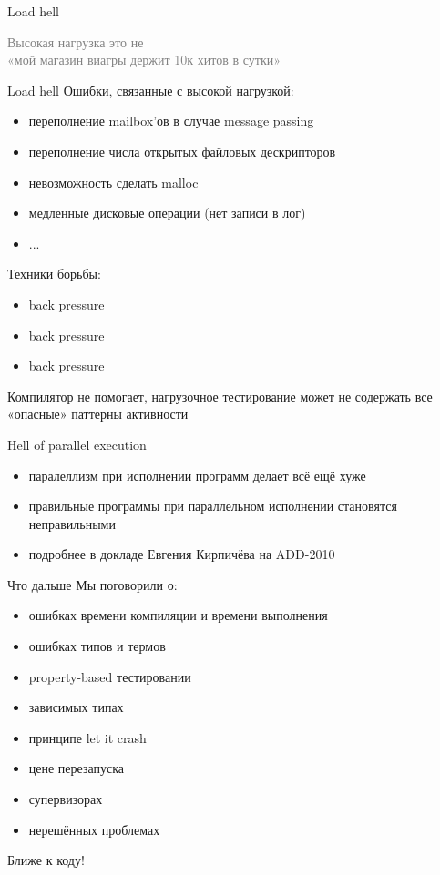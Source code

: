 \documentclass[10pt]{beamer}
\newcommand{\light}[1]{\textcolor{gray}{\footnotesize{#1}}}
\begin{document}
\begin{frame}{Load hell}
  \begin{center}
    \light{Высокая нагрузка это не\\«мой магазин виагры держит 10к хитов в сутки»}
  \end{center}
\end{frame}

\begin{frame}{Load hell}
  Ошибки, связанные с высокой нагрузкой:
  \begin{itemize}
  \item переполнение mailbox'ов в случае message passing
  \item переполнение числа открытых файловых дескрипторов
  \item невозможность сделать malloc
  \item медленные дисковые операции (нет записи в лог)
  \item ...
  \end{itemize}
  Техники борьбы:
  \begin{itemize}
  \item back pressure
  \item back pressure
  \item back pressure
  \end{itemize}
  Компилятор не помогает, нагрузочное тестирование может не содержать все «опасные» паттерны активности
\end{frame}

\begin{frame}{Hell of parallel execution}
  \begin{itemize}
  \item паралеллизм при исполнении программ делает всё ещё хуже
  \item правильные программы при параллельном исполнении становятся неправильными
  \item подробнее в докладе Евгения Кирпичёва на ADD-2010
  \end{itemize}
\end{frame}

\begin{frame}{Что дальше}
  Мы поговорили о:
  \begin{itemize}
  \item ошибках времени компиляции и времени выполнения
  \item ошибках типов и термов
  \item property-based тестировании
  \item зависимых типах
  \item принципе let it crash
  \item цене перезапуска
  \item супервизорах
  \item нерешённых проблемах
  \end{itemize}
  Ближе к коду!
\end{frame}
\end{document}
